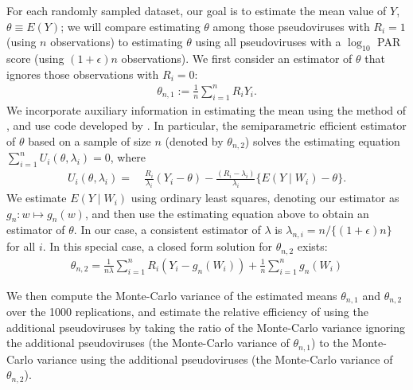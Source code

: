 \documentclass[10pt]{article}
\begin{document}
For each randomly sampled dataset, our goal is to estimate the mean value of $Y$, $\theta \equiv E(Y)$; we will compare estimating $\theta$ among those pseudoviruses with $R_i = 1$ (using $n$ observations) to estimating $\theta$ using all pseudoviruses with a $\log_{10}$ PAR score (using $(1+\epsilon)n$ observations). We first consider an estimator of $\theta$ that ignores those observations with $R_i = 0$:
\begin{align}\label{eq:sample_mean}
  \theta_{n,1} := \frac{1}{n}\sum_{i=1}^n R_i Y_i.
\end{align}
We incorporate auxiliary information in estimating the mean using the method of \citet{rotnitzky1995}, and use code developed by \citet{gilbert2014}. In particular, the semiparametric efficient estimator of $\theta$ based on a sample of size $n$ (denoted by $\theta_{n,2}$) solves the estimating equation $\sum_{i=1}^n U_i(\theta, \lambda_i) = 0$, where
\begin{align*}
    U_i(\theta, \lambda_i) =& \ \frac{R_i}{\lambda_i}(Y_i - \theta) - \frac{(R_i - \lambda_i)}{\lambda_i}\{E(Y \mid W_i) - \theta\}.
\end{align*}
We estimate $E(Y \mid W_i)$ using ordinary least squares, denoting our estimator as $g_n: w \mapsto g_n(w)$, and then use the estimating equation above to obtain an estimator of $\theta$. In our case, a consistent estimator of $\lambda$ is $\lambda_{n,i} = n / \{(1 + \epsilon)n\}$ for all $i$. In this special case, a closed form solution for $\theta_{n,2}$ exists:
\begin{align}\label{eq:aug_mean}
    \theta_{n,2} = \frac{1}{n\lambda}\sum_{i=1}^nR_i(Y_i - g_n(W_i)) + \frac{1}{n}\sum_{i=1}^n g_n(W_i)
\end{align}

We then compute the Monte-Carlo variance of the estimated means $\theta_{n,1}$ and $\theta_{n,2}$ over the 1000 replications, and estimate the relative efficiency of using the additional pseudoviruses by taking the ratio of the Monte-Carlo variance ignoring the additional pseudoviruses (the Monte-Carlo variance of $\theta_{n,1}$) to the Monte-Carlo variance using the additional pseudoviruses (the Monte-Carlo variance of $\theta_{n,2}$).
\end{document}
